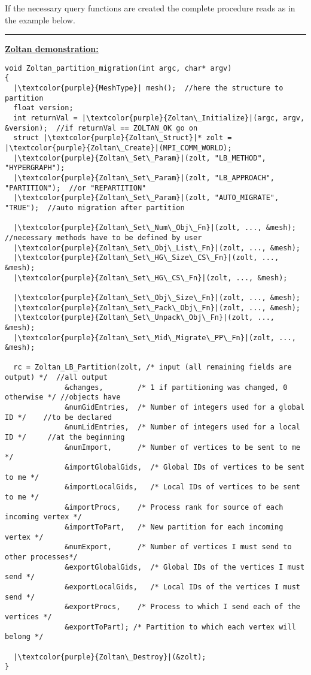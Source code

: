 \documentclass[10pt,a4paper,final,titlepage]{article}
\begin{document}
If the necessary query functions are created the complete procedure reads as in the example below.
\newpage
\noindent\rule{\textwidth}{0.5pt}
\textbf{\underline{Zoltan demonstration:}}
\begin{verbatim}
void Zoltan_partition_migration(int argc, char* argv)
{
  |\textcolor{purple}{MeshType}| mesh();  //here the structure to partition
  float version;
  int returnVal = |\textcolor{purple}{Zoltan\_Initialize}|(argc, argv, &version);  //if returnVal == ZOLTAN_OK go on
  struct |\textcolor{purple}{Zoltan\_Struct}|* zolt = |\textcolor{purple}{Zoltan\_Create}|(MPI_COMM_WORLD);
  |\textcolor{purple}{Zoltan\_Set\_Param}|(zolt, "LB_METHOD", "HYPERGRAPH");
  |\textcolor{purple}{Zoltan\_Set\_Param}|(zolt, "LB_APPROACH", "PARTITION");  //or "REPARTITION"
  |\textcolor{purple}{Zoltan\_Set\_Param}|(zolt, "AUTO_MIGRATE", "TRUE");  //auto migration after partition
  
  |\textcolor{purple}{Zoltan\_Set\_Num\_Obj\_Fn}|(zolt, ..., &mesh);  //necessary methods have to be defined by user
  |\textcolor{purple}{Zoltan\_Set\_Obj\_List\_Fn}|(zolt, ..., &mesh);
  |\textcolor{purple}{Zoltan\_Set\_HG\_Size\_CS\_Fn}|(zolt, ..., &mesh);
  |\textcolor{purple}{Zoltan\_Set\_HG\_CS\_Fn}|(zolt, ..., &mesh);
  
  |\textcolor{purple}{Zoltan\_Set\_Obj\_Size\_Fn}|(zolt, ..., &mesh);
  |\textcolor{purple}{Zoltan\_Set\_Pack\_Obj\_Fn}|(zolt, ..., &mesh);
  |\textcolor{purple}{Zoltan\_Set\_Unpack\_Obj\_Fn}|(zolt, ..., &mesh);
  |\textcolor{purple}{Zoltan\_Set\_Mid\_Migrate\_PP\_Fn}|(zolt, ..., &mesh);
  
  rc = Zoltan_LB_Partition(zolt, /* input (all remaining fields are output) */  //all output
              &changes,        /* 1 if partitioning was changed, 0 otherwise */ //objects have
              &numGidEntries,  /* Number of integers used for a global ID */    //to be declared
              &numLidEntries,  /* Number of integers used for a local ID */     //at the beginning
              &numImport,      /* Number of vertices to be sent to me */
              &importGlobalGids,  /* Global IDs of vertices to be sent to me */
              &importLocalGids,   /* Local IDs of vertices to be sent to me */
              &importProcs,    /* Process rank for source of each incoming vertex */
              &importToPart,   /* New partition for each incoming vertex */
              &numExport,      /* Number of vertices I must send to other processes*/
              &exportGlobalGids,  /* Global IDs of the vertices I must send */
              &exportLocalGids,   /* Local IDs of the vertices I must send */
              &exportProcs,    /* Process to which I send each of the vertices */
              &exportToPart); /* Partition to which each vertex will belong */
              
  |\textcolor{purple}{Zoltan\_Destroy}|(&zolt);
}
\end{verbatim}
\end{document}
